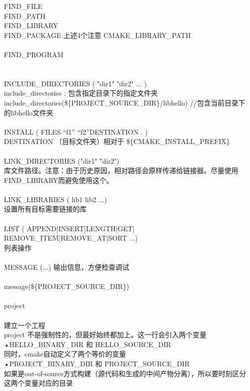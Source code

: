 \documentclass[11pt,a4paper,titlepage]{article}
\begin{document}
FIND\_FILE\\
FIND\_PATH\\
FIND\_LIBRARY\\
FIND\_PACKAGE    上述4个注意 CMAKE\_LIBRARY\_PATH\\
\\
FIND\_PROGRAM\\
\\
\\
INCLUDE\_DIRECTORIES ( "dir1" "dir2" ... )\\
include\_directories  : 包含指定目录下的指定文件夹\\
include\_directories(\$\{PROJECT\_SOURCE\_DIR\}/libhello)  //包含当前目录下的libhello文件夹\\
\\
INSTALL ( FILES “f1” “f2”DESTINATION . )\\
DESTINATION （目标文件夹）相对于 \$\{CMAKE\_INSTALL\_PREFIX\}\\
 \\
LINK\_DIRECTORIES ("dir1" "dir2")\\
 库文件路径。注意：由于历史原因，相对路径会原样传递给链接器。尽量使用FIND\_LIBRARY而避免使用这个。\\
 \\
LINK\_LIBRARIES ( lib1 lib2 ...)\\
设置所有目标需要链接的库\\
\\
LIST ( APPEND|INSERT|LENGTH|GET| REMOVE\_ITEM|REMOVE\_AT|SORT ...)\\
列表操作\\
\\
MESSAGE (...)  输出信息，方便检查调试\\
\\
message(\$\{PROJECT\_SOURCE\_DIR\})\\
\\
project\\
\\
建立一个工程\\
project   不是强制性的，但最好始终都加上。这一行会引入两个变量\\
•HELLO\_BINARY\_DIR 和 HELLO\_SOURCE\_DIR\\
同时，cmake自动定义了两个等价的变量\\
•PROJECT\_BINARY\_DIR   和  PROJECT\_SOURCE\_DIR\\
如果是out-of-source方式构建（源代码和生成的中间产物分离），所以要时刻区分这两个变量对应的目录\\
\\
\end{document}
